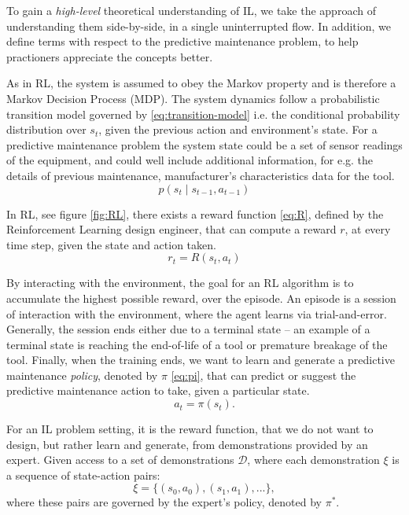 \documentclass{article}
\begin{document}
	To gain a \textit{high-level} theoretical understanding of IL, we take the approach of understanding them side-by-side, in a single uninterrupted flow. In addition, we define terms with respect to the predictive maintenance problem, to help practioners appreciate the concepts better. 
	
	As in RL, the system is assumed to obey the Markov property and is therefore a Markov Decision Process (MDP). The system dynamics follow a probabilistic transition model governed by \eqref{eq:transition-model} i.e. the conditional probability distribution over $s_t$, given the previous action and environment's state. For a predictive maintenance problem the system state could be a set of sensor readings of the equipment, and could well include additional information, for e.g. the details of previous maintenance, manufacturer's characteristics data for the tool.
	\begin{equation}\label{eq:transition-model}
		p(s_t \mid s_{t-1}, a_{t-1})
	\end{equation}
	
	In RL, see figure \ref{fig:RL}, there exists a reward function \eqref{eq:R}, defined by the Reinforcement Learning design engineer, that can compute a reward $r$, at every time step, given the state and action taken.
	\begin{equation}\label{eq:R}
		r_t = R(s_t, a_t)
	\end{equation}
	
	By interacting with the environment, the goal for an RL algorithm is to accumulate the highest possible reward, over the episode. An episode is a session of interaction with the environment, where the agent learns via trial-and-error. Generally, the session ends either due to a terminal state -- an example of a terminal state is reaching the end-of-life of a tool or premature breakage of the tool. Finally, when the training ends, we want to learn and generate a predictive maintenance \textit{policy}, denoted by $\pi$ \eqref{eq:pi}, that can predict or suggest the predictive maintenance action to take, given a particular state.
	\begin{equation}\label{eq:pi}
		a_t = \pi(s_t).
	\end{equation}
	
	For an IL problem setting, it is the reward function, that we do not want to design, but rather learn and generate, from demonstrations provided by an expert. Given access to a set of demonstrations $\mathcal{D}$, where each demonstration $\xi$ is a sequence of state-action pairs:
	\begin{equation}\label{eq:demo}
		\xi = \{(s_0, a_0), (s_1, a_1), ...\},
	\end{equation}
	where these pairs are governed by the expert's policy, denoted by $\pi^{*}$.
	
\end{document}
